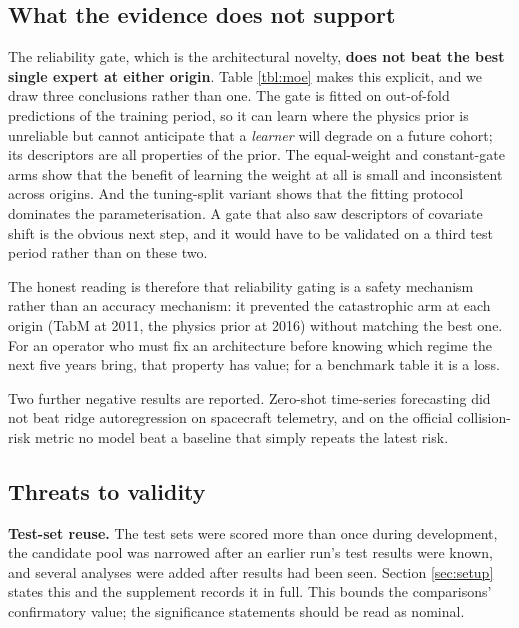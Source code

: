 \documentclass[3p,times]{elsarticle}
\begin{document}
\subsection{What the evidence does not
support}\label{what-the-evidence-does-not-support}

The reliability gate, which is the architectural novelty, \textbf{does
not beat the best single expert at either origin}. Table \ref{tbl:moe}
makes this explicit, and we draw three conclusions rather than one. The
gate is fitted on out-of-fold predictions of the training period, so it
can learn where the physics prior is unreliable but cannot anticipate
that a \emph{learner} will degrade on a future cohort; its descriptors
are all properties of the prior. The equal-weight and constant-gate arms
show that the benefit of learning the weight at all is small and
inconsistent across origins. And the tuning-split variant shows that the
fitting protocol dominates the parameterisation. A gate that also saw
descriptors of covariate shift is the obvious next step, and it would
have to be validated on a third test period rather than on these two.

The honest reading is therefore that reliability gating is a safety
mechanism rather than an accuracy mechanism: it prevented the
catastrophic arm at each origin (TabM at 2011, the physics prior at
2016) without matching the best one. For an operator who must fix an
architecture before knowing which regime the next five years bring, that
property has value; for a benchmark table it is a loss.

Two further negative results are reported. Zero-shot time-series
forecasting did not beat ridge autoregression on spacecraft telemetry,
and on the official collision-risk metric no model beat a baseline that
simply repeats the latest risk.

\subsection{Threats to validity}\label{threats-to-validity}

\textbf{Test-set reuse.} The test sets were scored more than once during
development, the candidate pool was narrowed after an earlier run's test
results were known, and several analyses were added after results had
been seen. Section \ref{sec:setup} states this and the supplement
records it in full. This bounds the comparisons' confirmatory value; the
significance statements should be read as nominal.
\end{document}

